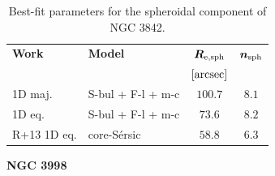 \documentclass[preprint2]{emulateapj}
\begin{document}
  \begin{table}[h]
  \small
  \caption{Best-fit parameters for the spheroidal component of NGC 3842.}
  \begin{center}
  \begin{tabular}{llcc}
  \hline
  {\bf Work} & {\bf Model}   & $\bm R_{\rm e,sph}$    & $\bm n_{\rm sph}$ \\
    &  &  $[\rm arcsec]$ & \\
  \hline
  1D maj. & S-bul + F-l + m-c  & $100.7$  &  $8.1$ \\
  1D eq.  & S-bul + F-l + m-c  & $73.6$   &  $8.2$ \\
  \hline
  R+13 1D eq.         & core-S\'ersic & $58.8$  &  $6.3$ \\
  \hline
  \end{tabular}
  \end{center}
  \label{tab:n3842}
  \end{table}  


  \clearpage\newpage\noindent
  {\bf NGC 3998 \\}
\end{document}
